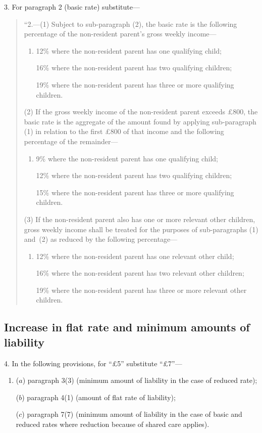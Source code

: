 \documentclass[12pt,a4paper]{article}
\begin{document}
3. For paragraph 2 (basic rate) substitute—
\begin{quotation}
“2.---(1) Subject to sub-paragraph (2), the basic rate is the following percentage of the non-resident parent's gross weekly income—
\begin{enumerate}\item[]
12\% where the non-resident parent has one qualifying child;

16\% where the non-resident parent has two qualifying children;

19\% where the non-resident parent has three or more qualifying children.
\end{enumerate}

(2) If the gross weekly income of the non-resident parent exceeds £800, the basic rate is the aggregate of the amount found by applying sub-paragraph (1) in relation to the first £800 of that income and the following percentage of the remainder—
\begin{enumerate}\item[]
9\% where the non-resident parent has one qualifying child;

12\% where the non-resident parent has two qualifying children;

15\% where the non-resident parent has three or more qualifying children.
\end{enumerate}

(3) If the non-resident parent also has one or more relevant other children, gross weekly income shall be treated for the purposes of sub-paragraphs (1) and~(2) as reduced by the following percentage—
\begin{enumerate}\item[]
12\% where the non-resident parent has one relevant other child;

16\% where the non-resident parent has two relevant other children;

19\% where the non-resident parent has three or more relevant other children.
\end{enumerate}
\end{quotation}

\subsection*{Increase in flat rate and minimum amounts of liability}

4. In the following provisions, for “£5” substitute “£7”---
\begin{enumerate}\item[]
($a$) paragraph 3(3) (minimum amount of liability in the case of reduced rate);

($b$) paragraph 4(1) (amount of flat rate of liability);

($c$) paragraph 7(7) (minimum amount of liability in the case of basic and reduced rates where reduction because of shared care applies).
\end{enumerate}
\end{document}
